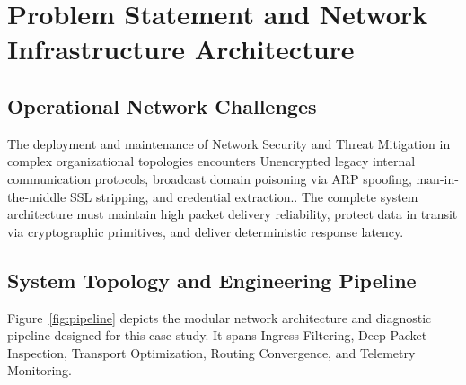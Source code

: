\section{Problem Statement and Network Infrastructure Architecture}

\subsection{Operational Network Challenges}
The deployment and maintenance of Network Security and Threat Mitigation in complex organizational topologies encounters Unencrypted legacy internal communication protocols, broadcast domain poisoning via ARP spoofing, man-in-the-middle SSL stripping, and credential extraction.. The complete system architecture must maintain high packet delivery reliability, protect data in transit via cryptographic primitives, and deliver deterministic response latency.

\subsection{System Topology and Engineering Pipeline}
Figure~\ref{fig:pipeline} depicts the modular network architecture and diagnostic pipeline designed for this case study. It spans Ingress Filtering, Deep Packet Inspection, Transport Optimization, Routing Convergence, and Telemetry Monitoring.

